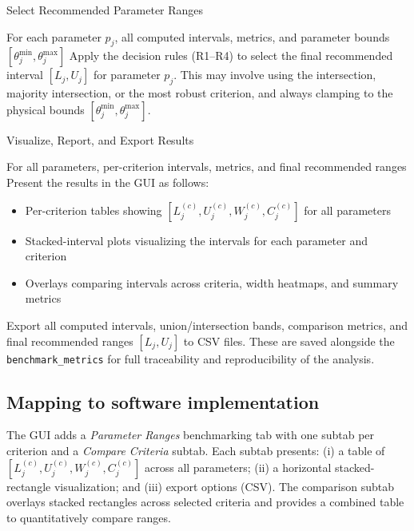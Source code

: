 \documentclass[12pt,a4paper]{article}
\begin{document}
\begin{algorithm}[H]
\caption{Select Recommended Parameter Ranges}
\begin{algorithmic}[1]
\REQUIRE For each parameter $p_j$, all computed intervals, metrics, and parameter bounds $[\theta_j^{\min}, \theta_j^{\max}]$
    \STATE Apply the decision rules (R1--R4) to select the final recommended interval $[L_j, U_j]$ for parameter $p_j$. This may involve using the intersection, majority intersection, or the most robust criterion, and always clamping to the physical bounds $[\theta_j^{\min}, \theta_j^{\max}]$.
\ENDFOR
\end{algorithmic}
\end{algorithm}

\begin{algorithm}[H]
\caption{Visualize, Report, and Export Results}
\begin{algorithmic}[1]
\REQUIRE For all parameters, per-criterion intervals, metrics, and final recommended ranges
\STATE Present the results in the GUI as follows:
    \begin{itemize}
        \item Per-criterion tables showing $[L^{(c)}_j, U^{(c)}_j, W^{(c)}_j, C^{(c)}_j]$ for all parameters
        \item Stacked-interval plots visualizing the intervals for each parameter and criterion
        \item Overlays comparing intervals across criteria, width heatmaps, and summary metrics
    \end{itemize}
\STATE Export all computed intervals, union/intersection bands, comparison metrics, and final recommended ranges $[L_j, U_j]$ to CSV files. These are saved alongside the \texttt{benchmark\_metrics} for full traceability and reproducibility of the analysis.
\end{algorithmic}
\end{algorithm}

\subsection{Mapping to software implementation}
The GUI adds a \emph{Parameter Ranges} benchmarking tab with one subtab per criterion and a \emph{Compare Criteria} subtab. Each subtab presents: (i) a table of $[L^{(c)}_j, U^{(c)}_j, W^{(c)}_j, C^{(c)}_j]$ across all parameters; (ii) a horizontal stacked-rectangle visualization; and (iii) export options (CSV). The comparison subtab overlays stacked rectangles across selected criteria and provides a combined table to quantitatively compare ranges.
\end{document}
